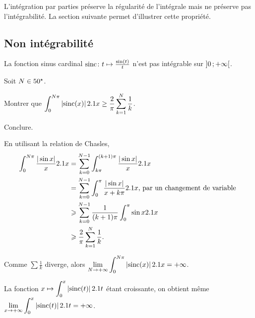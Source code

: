 \begin{remarque}
L'intégration par parties préserve la régularité de l'intégrale mais ne préserve pas l'intégrabilité. La section suivante permet d'illustrer cette propriété.
\end{remarque}

\subsection{Non intégrabilité}

\begin{prop}
    La fonction sinus cardinal $\fonctionligne[\mathrm{sinc}]{t}{\frac{\sin(t)}{t}}$ n'est pas intégrable sur $\interoo{0}{+\infty}$.
\end{prop}


\begin{exercice}
Soit $N \in \Ne$.
\begin{questions}
\item Montrer que $\displaystyle\int_0^{N\pi} \module{\mathrm{sinc}(x)} \d x \geq \frac{2}{\pi} \sum_{k=1}^N \frac{1}{k}$.

\item Conclure.
\end{questions}
\end{exercice}

\begin{demo}
\begin{reponses}
\item En utilisant la relation de Chasles,
    \begin{align*}
        \int_0^{N \pi} \frac{|\sin x|}{x} \d x &= \sum_{k=0}^{N-1} \int_{k \pi}^{(k+1) \pi} \frac{|\sin x|}{x} \d x \\
&= \sum_{k=0}^{N-1} \int_0^\pi \frac{|\sin x|}{x + k \pi} \d x        \text{, par un changement de variable }  \\
        &\geqslant \sum_{k=0}^{N-1} \frac{1}{(k+1) \pi} \int_0^\pi \sin x \d x \\
        &\geqslant \frac{2}{\pi} \sum_{k=1}^N \frac{1}{k}.
        \end{align*}

\item Comme $\sum \frac{1}{k}$ diverge, alors $\displaystyle\lim\limits_{N\to+\infty} \int_0^{N\pi} \module{\mathrm{sinc}(x)} \d x = +\infty$.

La fonction $x \mapsto \displaystyle\int_0^x \module{\mathrm{sinc}(t)} \d t$ étant croissante, on obtient même $\displaystyle \lim_{x\to+\infty} \int_0^x \module{\mathrm{sinc}(t)} \d t = +\infty$.
\end{reponses}
\end{demo}


